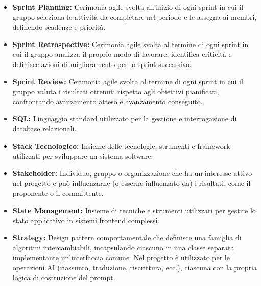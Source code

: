 \begin{itemize}[leftmargin=*]
      \item \textbf{Sprint Planning:} Cerimonia agile svolta all'inizio di ogni
            sprint in cui il gruppo seleziona le attività da completare nel periodo
            e le assegna ai membri, definendo scadenze e priorità.
      \item \textbf{Sprint Retrospective:} Cerimonia agile svolta al termine di
            ogni sprint in cui il gruppo analizza il proprio modo di lavorare,
            identifica criticità e definisce azioni di miglioramento per lo sprint
            successivo.
      \item \textbf{Sprint Review:} Cerimonia agile svolta al termine di ogni sprint
            in cui il gruppo valuta i risultati ottenuti rispetto agli obiettivi
            pianificati, confrontando avanzamento atteso e avanzamento conseguito.
      \item \textbf{SQL:} Linguaggio standard utilizzato per la gestione e interrogazione di database relazionali.
      \item \textbf{Stack Tecnologico:} Insieme delle tecnologie, strumenti e framework utilizzati per sviluppare un sistema software.
      \item \textbf{Stakeholder:} Individuo, gruppo o organizzazione che ha un interesse attivo nel progetto e può influenzarne (o esserne influenzato da) i risultati, come il proponente o il committente.
      \item \textbf{State Management:} Insieme di tecniche e strumenti utilizzati per gestire lo stato applicativo in sistemi frontend complessi.
      \item \textbf{Strategy:} Design pattern comportamentale che definisce una famiglia di algoritmi intercambiabili, incapsulando ciascuno in una classe separata implementante un'interfaccia comune. Nel progetto è utilizzato per le operazioni AI (riassunto, traduzione, riscrittura, ecc.), ciascuna con la propria logica di costruzione del prompt.
\end{itemize}
 
{}
